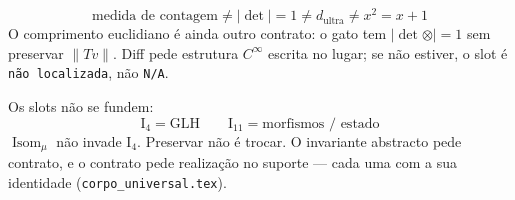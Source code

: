 \documentclass[livro.tex]{subfiles}
\begin{document}
\begin{observacao}\label{fis:obs:U-reguas}
\[
\boxed{\;
\text{medida de contagem}
\neq
\lvert\det\rvert=1
\neq
d_{\mathrm{ultra}}
\neq
x^{2}=x+1
\;}
\]
O comprimento euclidiano é ainda outro contrato: o gato tem
$\lvert\det\otimes\rvert=1$ sem preservar $\lVert Tv\rVert$. Diff pede
estrutura $C^{\infty}$ escrita no lugar; se não estiver, o slot é
\texttt{não localizada}, não \texttt{N/A}.
\end{observacao}

\noindent Os slots não se fundem:
\[
\boxed{\;\mathrm{I}_{4}=\mathrm{GLH}
\qquad
\mathrm{I}_{11}=\text{morfismos / estado}\;}
\]
\(\operatorname{Isom}_{\mu}\) não invade \(\mathrm{I}_{4}\). Preservar
não é trocar. O invariante abstracto pede contrato, e o contrato pede
realização no suporte --- cada uma com a sua identidade
(\texttt{corpo\_universal.tex}).
\end{document}
